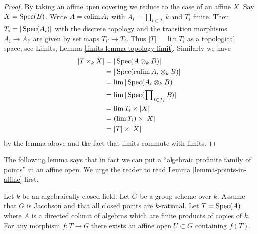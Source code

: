 \begin{proof}
By taking an affine open covering we reduce to the case of an affine $X$.
Say $X = \mathop{\mathrm{Spec}}(B)$.
Write $A = \mathop{\mathrm{colim}}\nolimits A_i$ with $A_i = \prod_{t \in T_i} k$ and $T_i$ finite.
Then $T_i = |\mathop{\mathrm{Spec}}(A_i)|$ with the discrete topology and the transition
morphisms $A_i \to A_{i'}$ are given by set maps $T_{i'} \to T_i$. Thus
$|T| = \lim T_i$ as a topological space, see
Limits, Lemma \ref{limits-lemma-topology-limit}. Similarly we have
\begin{align*}
|T \times_k X| & =
|\mathop{\mathrm{Spec}}(A \otimes_k B)| \\
& =
|\mathop{\mathrm{Spec}}(\mathop{\mathrm{colim}}\nolimits A_i \otimes_k B)| \\
& =
\mathop{\mathrm{lim}}\nolimits |\mathop{\mathrm{Spec}}(A_i \otimes_k B)| \\
& =
\mathop{\mathrm{lim}}\nolimits |\mathop{\mathrm{Spec}}(\prod\nolimits_{t \in T_i} B)| \\
& =
\mathop{\mathrm{lim}}\nolimits T_i \times |X| \\
& =
(\mathop{\mathrm{lim}}\nolimits T_i) \times |X| \\
& =
|T| \times |X|
\end{align*}
by the lemma above and the fact that limits commute with limits.
\end{proof}

\noindent
The following lemma says that in fact we can put a
``algebraic profinite family of points'' in an affine open.
We urge the reader to read Lemma \ref{lemma-points-in-affine} first.

\begin{lemma}
\label{lemma-compact-set-in-affine}
Let $k$ be an algebraically closed field. Let $G$ be a group scheme over $k$.
Assume that $G$ is Jacobson and that all closed points are $k$-rational.
Let $T = \mathop{\mathrm{Spec}}(A)$ where $A$ is a directed colimit of algebras which
are finite products of copies of $k$. For any morphism $f : T \to G$
there exists an affine open $U \subset G$ containing $f(T)$.
\end{lemma}

